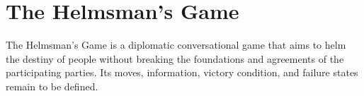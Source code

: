\chapter{The Helmsman's Game}
\label{chap:helmsmans-game}


The Helmsman's Game is a diplomatic conversational game that aims to helm the
destiny of people without breaking the foundations and agreements of the
participating parties. Its moves, information, victory condition, and failure
states remain to be defined.
